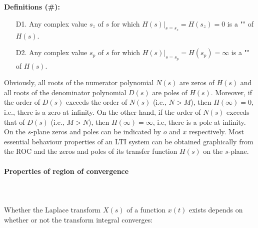 	\textbf{Definitions (\#\mydef):}
	\begin{enumerate}
		\item[D1.] Any complex value $s_z$ of $s$ for which $H(s)|_{s=s_z}=H(s_z)=0$ is a "" of $H(s)$.

		\item[D2.]  Any complex value $s_p$ of $s$ for which $H(s)|_{s=s_p}=H(s_p)=\infty$ is a "" of $H(s)$.
	\end{enumerate}
	Obviously, all roots of the numerator polynomial $N(s)$ are zeros of $H(s)$ and all roots of the denominator polynomial $D(s)$ are poles of $H(s)$. Moreover, if the order of $D(s)$ exceeds the order of $N(s)$ (i.e., $N>M$), then $H(\infty)=0$, i.e., there is a zero at infinity. On the other hand, if the order of $N(s)$ exceeds that of $D(s)$ (i.e., $M>N$), then $H(\infty)=\infty$, i.e, there is a pole at infinity. On the $s$-plane zeros and poles can be indicated by $o$ and $x$ respectively. Most essential behaviour properties of an LTI system can be obtained graphically from the ROC and the zeros and poles of its transfer function $H(s)$ on the $s$-plane.
	
	\paragraph{Properties of region of convergence}\mbox{}\\\\
	Whether the Laplace transform $X(s)$ of a function $x(t)$ exists depends on whether or not the transform integral converges:
	
